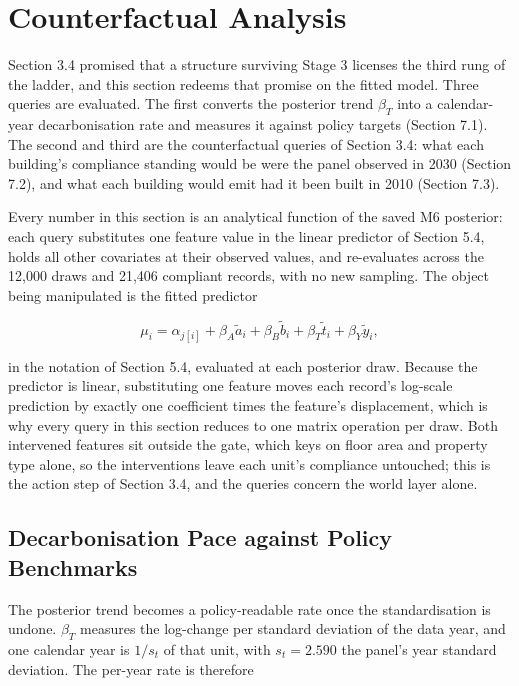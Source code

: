 \FloatBarrier
\section{Counterfactual Analysis}

Section 3.4 promised that a structure surviving Stage 3 licenses the third rung of the ladder, and this section redeems that promise on the fitted model. Three queries are evaluated. The first converts the posterior trend $\beta_T$ into a calendar-year decarbonisation rate and measures it against policy targets (Section 7.1). The second and third are the counterfactual queries of Section 3.4: what each building's compliance standing would be were the panel observed in 2030 (Section 7.2), and what each building would emit had it been built in 2010 (Section 7.3).

Every number in this section is an analytical function of the saved M6 posterior: each query substitutes one feature value in the linear predictor of Section 5.4, holds all other covariates at their observed values, and re-evaluates across the 12,000 draws and 21,406 compliant records, with no new sampling. The object being manipulated is the fitted predictor

\[
\mu_i = \alpha_{j[i]} + \beta_A \tilde{a}_i + \beta_B \tilde{b}_i + \beta_T \tilde{t}_i + \beta_Y \tilde{y}_i,
\]

in the notation of Section 5.4, evaluated at each posterior draw. Because the predictor is linear, substituting one feature moves each record's log-scale prediction by exactly one coefficient times the feature's displacement, which is why every query in this section reduces to one matrix operation per draw. Both intervened features sit outside the gate, which keys on floor area and property type alone, so the interventions leave each unit's compliance untouched; this is the action step of Section 3.4, and the queries concern the world layer alone.

\subsection{Decarbonisation Pace against Policy Benchmarks}

The posterior trend becomes a policy-readable rate once the standardisation is undone. $\beta_T$ measures the log-change per standard deviation of the data year, and one calendar year is $1/s_t$ of that unit, with $s_t = 2.590$ the panel's year standard deviation. The per-year rate is therefore

